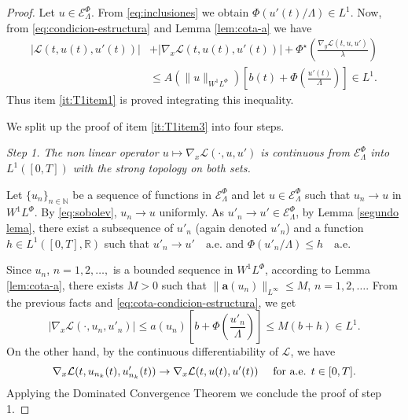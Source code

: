 \documentclass[twoside]{article}
\theoremstyle{remark}
\newcommand{\lphi}{L^{\Phi}}
\newcommand{\wphi}{W^{1}\lphi}
\newcommand{\sobnor}{\|_{W^{1}\lphi}}
\newcommand{\domi}{\mathcal{E}^{\Phi}}
\renewcommand{\b}[1]{\boldsymbol{#1}}
\newcommand{\rr}{\mathbb{R}}
\renewcommand{\leq}{\leqslant}
\begin{document}
\begin{proof}
Let $u\in \domi_{\Lambda}$. From \eqref{eq:inclusiones} we obtain $\Phi( u'(t)/\Lambda) \in L^1$.
Now, from  \eqref{eq:condicion-estructura} and Lemma \ref{lem:cota-a} we have
 \begin{equation}\label{eq:cota-condicion-estructura}
   \begin{split}
|\mathcal{L}(t,u(t),u'(t))|&+ |\nabla_x\mathcal{L}(t,u(t),u'(t))|
+\Phi^{\star}\left(\frac{\nabla_y\mathcal{L}(t,u,u')}{\lambda}\right)
\\
&\leq A(\|u\sobnor ) \left[b(t)+ \Phi\left(\frac{u'(t)}{\Lambda}\right) \right]\in
 L^1.
\end{split}
\end{equation}
Thus item \eqref{it:T1item1} is proved integrating this inequality.

We split up the proof of item \ref{it:T1item3} into four steps.

\noindent\emph{Step 1. The non linear operator  $u \mapsto \nabla_x\mathcal{L}(\cdot,u,u')$ is continuous from $\domi_{\Lambda}$ into $L^{1}([0,T])$ with the strong topology on both sets.} 



Let   $\{u_n\}_{n\in \mathbb{N}}$ be a sequence of  functions in $\domi_{\Lambda}$  
and let $u\in \domi_{\Lambda}$  such that $u_n\rightarrow u$ in $\wphi$.
By \eqref{eq:sobolev},  $u_n \to u$ uniformly.
As $u'_n\rightarrow u'\in\domi_{\Lambda}$, by 
  Lemma \ref{segundo lema}, there exist a subsequence of  $u'_{n}$ (again denoted $u'_{n}$) and a function  
	$h\in L^1([0,T],\rr)$
	such that  $u'_{n}\rightarrow u' \quad\text{a.e.}$ and $\Phi(u'_{n}/\Lambda)\leq h\quad\text{a.e}$.  

Since $u_{n}$, $n=1,2,\ldots,$ is a bounded sequence in $\wphi$, according to  Lemma \eqref{lem:cota-a}, 
there exists $M>0$ such that $\|\b{a}(u_{n})\|_{L^{\infty}} \leq M$, $n=1,2,\ldots$.  
From the previous facts and \eqref{eq:cota-condicion-estructura}, we get
\begin{equation*}\label{eq:DxL1-bis}
  |\nabla_x\mathcal{L}(\cdot,u_{n},u'_{n})|\leq a(u_{n})\left[b+\Phi\left(\frac{u'_{n}}{\Lambda}\right)\right]\leq
M (b+h) \in L^1.
\end{equation*}
On the other hand, by the continuous differentiability of $\mathcal{L}$, we have
\[\nabla_x\mathcal{L}(t,u_{n_k}(t),u'_{n_k}(t))\to \nabla_x\mathcal{L}(t,u(t),u'(t))\quad\hbox{ for a.e. } t\in[0,T].\]
Applying the Dominated Convergence Theorem we conclude the proof of step 1.



\end{proof}
\end{document}
